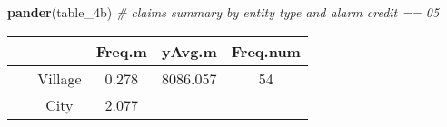 \documentclass[]{book}
\newenvironment{Shaded}{\begin{snugshade}}{\end{snugshade}}
\newcommand{\KeywordTok}[1]{\textcolor[rgb]{0.13,0.29,0.53}{\textbf{#1}}}
\newcommand{\CommentTok}[1]{\textcolor[rgb]{0.56,0.35,0.01}{\textit{#1}}}
\newcommand{\NormalTok}[1]{#1}
\theoremstyle{definition}
\theoremstyle{definition}
\theoremstyle{definition}
\theoremstyle{remark}
\begin{document}
\begin{Shaded}
\begin{Highlighting}[]
\KeywordTok{pander}\NormalTok{(table_4b)  }\CommentTok{# claims summary by entity type and alarm credit == 05 }
\end{Highlighting}
\end{Shaded}

\begin{longtable}[]{@{}ccccc@{}}
\toprule
\begin{minipage}[b]{0.12\columnwidth}\centering\strut
~\strut
\end{minipage} & \begin{minipage}[b]{0.12\columnwidth}\centering\strut
~\strut
\end{minipage} & \begin{minipage}[b]{0.11\columnwidth}\centering\strut
Freq.m\strut
\end{minipage} & \begin{minipage}[b]{0.14\columnwidth}\centering\strut
yAvg.m\strut
\end{minipage} & \begin{minipage}[b]{0.14\columnwidth}\centering\strut
Freq.num\strut
\end{minipage}\tabularnewline
\midrule
\endhead
\begin{minipage}[t]{0.12\columnwidth}\centering\strut
\strut
\end{minipage} & \begin{minipage}[t]{0.12\columnwidth}\centering\strut
Village\strut
\end{minipage} & \begin{minipage}[t]{0.11\columnwidth}\centering\strut
0.278\strut
\end{minipage} & \begin{minipage}[t]{0.14\columnwidth}\centering\strut
8086.057\strut
\end{minipage} & \begin{minipage}[t]{0.14\columnwidth}\centering\strut
54\strut
\end{minipage}\tabularnewline
\begin{minipage}[t]{0.12\columnwidth}\centering\strut
\strut
\end{minipage} & \begin{minipage}[t]{0.12\columnwidth}\centering\strut
City\strut
\end{minipage} & \begin{minipage}[t]{0.11\columnwidth}\centering\strut
2.077\strut
\end{minipage} & \begin{minipage}[t]{0.14\columnwidth}\centering\strut

\end{minipage}
\end{longtable}
\end{document}
